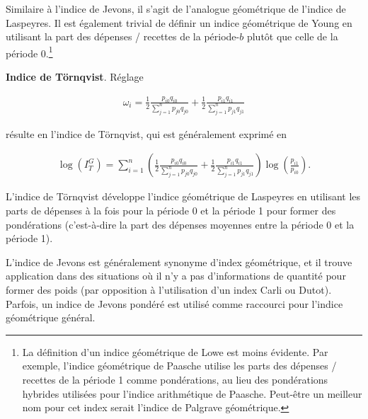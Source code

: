 \documentclass[]{article}
\begin{document}
Similaire à l'indice de Jevons, il s'agit de l'analogue géométrique de l'indice de Laspeyres. Il est également trivial de définir un indice géométrique de Young en utilisant la part des dépenses / recettes de la période-\(b\) plutôt que celle de la période 0.\footnote{La définition d'un indice géométrique de Lowe est moins évidente. Par exemple, l'indice géométrique de Paasche utilise les parts des dépenses / recettes de la période 1 comme pondérations, au lieu des pondérations hybrides utilisées pour l'indice arithmétique de Paasche. Peut-être un meilleur nom pour cet index serait l'indice de Palgrave géométrique.}

\textbf{Indice de Törnqvist}. Réglage

\begin{align*}
\omega_{i} = \frac{1}{2} \frac{p_{i0} q_{i0}}{\sum_{j = 1}^{n} p_{j0} q_{j0}} + \frac{1}{2} \frac{p_{i1} q_{i1}}{\sum_{j = 1}^{n} p_{j1} q_{j1}}
\end{align*}

résulte en l'indice de Törnqvist, qui est généralement exprimé en

\begin{align*}
\log(I^{G}_{T}) = \sum_{i = 1}^{n} \left(\frac{1}{2} \frac{p_{i0} q_{i0}}{\sum_{j = 1}^{n} p_{j0} q_{j0}} + \frac{1}{2} \frac{p_{i1} q_{i1}}{\sum_{j = 1}^{n} p_{j1} q_{j1}} \right) \log\left(\frac{p_{i1}}{p_{i0}} \right).
\end{align*}

L'indice de Törnqvist développe l'indice géométrique de Laspeyres en utilisant les parts de dépenses à la fois pour la période 0 et la période 1 pour former des pondérations (c'est-à-dire la part des dépenses moyennes entre la période 0 et la période 1).

L'indice de Jevons est généralement synonyme d'index géométrique, et il trouve application dans des situations où il n'y a pas d'informations de quantité pour former des poids (par opposition à l'utilisation d'un index Carli ou Dutot). Parfois, un indice de Jevons pondéré est utilisé comme raccourci pour l'indice géométrique général.
\end{document}
